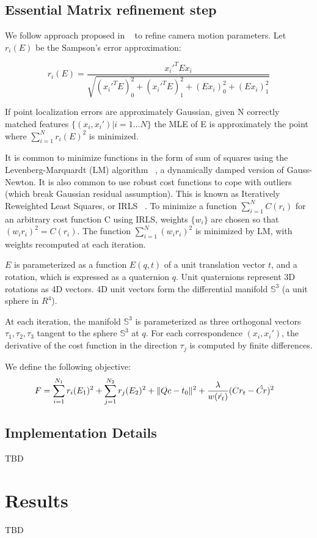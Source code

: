 \documentclass[10pt]{article}         %
\DeclarePairedDelimiter\norm{\lVert}{\rVert}%
\begin{document}
\subsection{Essential Matrix refinement step}

We follow approach proposed in ~\cite{Botterill-etal-2011c} to refine
camera motion parameters. Let $r_i(E)$ be the Sampson's error
approximation:

\[
r_i(E) = \frac{x_i'^TEx_i}{\sqrt{(x_i'^TE)^2_0+(x_i'^TE)^2_1+(Ex_i)^2_0+(Ex_i)^2_1}}
\]

If point localization errors are approximately Gaussian, given N
correctly matched features $\{(x_i,x_i') | i=1\ldots N\}$ the MLE of E is approximately
the point where $\sum_{i=1}^{N} r_i(E)^2$ is minimized.

It is common to minimize functions in the form of sum of squares using
the Levenberg-Marquardt (LM) algorithm ~\cite{marquardt1963algorithm},
a dynamically damped version of Gauss-Newton.  It is also common to
use robust cost functions to cope with outliers (which break Gaussian
residual assumption).  This is known as Iteratively Reweighted Least
Squares, or IRLS ~\cite{Hartley2004}.  To minimize a function
$\sum_{i=1}^N C(r_i)$ for an arbitrary cost function C using IRLS,
weights $\{w_i\}$ are chosen so that $(w_ir_i)^2=C(r_i)$. The function
$\sum_{i=1}^N (w_ir_i)^2$ is minimized by LM, with weights recomputed
at each iteration.

$E$ is parameterized as a function $E(q,t)$ of a unit translation
vector $t$, and a rotation, which is expressed as a quaternion
$q$. Unit quaternions represent 3D rotations as 4D vectors. 4D unit
vectors form the differential manifold $\mathbb{S}^3$ (a unit sphere
in $R^4$).

At each iteration, the manifold $\mathbb{S}^3$ is parameterized as
three orthogonal vectors $\tau_1,\tau_2,\tau_3$ tangent to the sphere
$\mathbb{S}^3$ at $q$.  For each correspondence $(x_i,x_i')$, the
derivative of the cost function in the direction $\tau_j$ is computed
by finite differences.

 We define the following objective:
\begin{align*}
  F &= \sum_{i=1}^{N_1}{ r_i(E_1)^2 } + \sum_{j=1}^{N_2}{ r_j(E_2)^2 }
  + \norm{Qc-t_0}^2 + \frac{\lambda}{w(\hat{r_t})}(Cr_t - \hat{Cr})^2
\end{align*}

\subsection{Implementation Details}
TBD

\section{Results}
TBD



\end{document}
